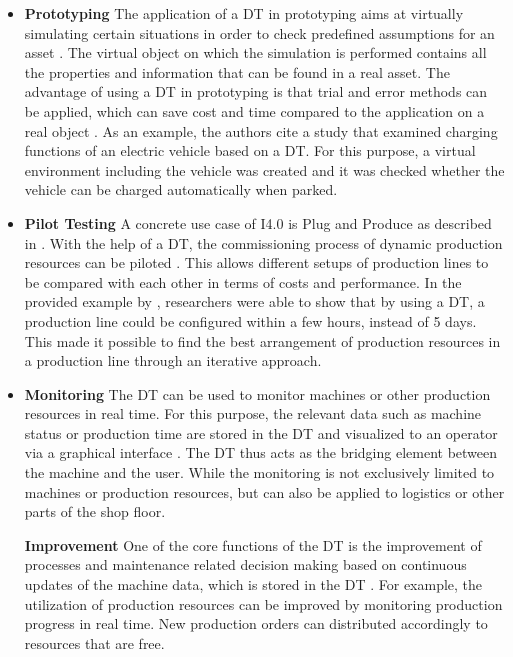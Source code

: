 \begin{itemize}
    \item [] \textbf{Prototyping} The application of a \ac{DT} in prototyping aims at virtually simulating certain situations in order to check predefined assumptions for an asset \cite[p. 7]{Son2021PastManufacturing}. The virtual object on which the simulation is performed contains all the properties and information that can be found in a real asset. The advantage of using a \ac{DT} in prototyping is that trial and error methods can be applied, which can save cost and time compared to the application on a real object \cite[p. 2]{Son2021PastManufacturing}. As an example, the authors cite a study that examined charging functions of an electric vehicle based on a \ac{DT}. For this purpose, a virtual environment including the vehicle was created and it was checked whether the vehicle can be charged automatically when parked.
    
    \item[] \textbf{Pilot Testing} A concrete use case of \ac{I4.0} is Plug and Produce as described in \cite{Schleipen2015Requirements4.0}. With the help of a \ac{DT}, the commissioning process of dynamic production resources can be piloted \cite[p. 9]{Son2021PastManufacturing}. This allows different setups of production lines to be compared with each other in terms of costs and performance. In the provided example by \citeauthor{Son2021PastManufacturing}, researchers were able to show that by using a \ac{DT}, a production line could be configured within a few hours, instead of 5 days. This made it possible to find the best arrangement of production resources in a production line through an iterative approach. 
    
    \item[] \textbf{Monitoring} The \ac{DT} can be used to monitor machines or other production resources in real time. For this purpose, the relevant data such as machine status or production time are stored in the \ac{DT} and visualized to an operator via a graphical interface \cite[p. 11]{Son2021PastManufacturing}. The \ac{DT} thus acts as the bridging element between the machine and the user. While the monitoring is not exclusively limited to machines or production resources, but can also be applied to logistics or other parts of the shop floor. 
    
    \textbf{Improvement} One of the core functions of the \ac{DT} is the improvement of processes and maintenance related decision making based on continuous updates of the machine data, which is stored in the \ac{DT} \cite[p. 14]{Son2021PastManufacturing}. For example, the utilization of production resources can be improved by monitoring production progress in real time. New production orders can distributed accordingly to resources that are free.
    

\end{itemize}
